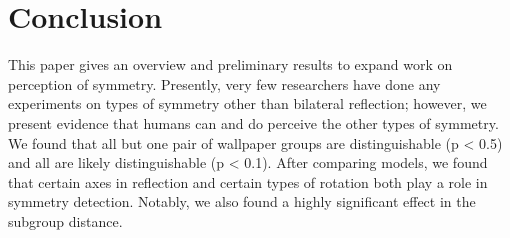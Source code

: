 \section{Conclusion}
This paper gives an overview and preliminary results to expand work on perception of symmetry. Presently, very few researchers have done any experiments on types of symmetry other than bilateral reflection; however, we present evidence that humans can and do perceive the other types of symmetry. We found that all but one pair of wallpaper groups are distinguishable (p < 0.5) and all are likely distinguishable (p < 0.1). After comparing models, we found that certain axes in reflection and certain types of rotation both play a role in symmetry detection. Notably, we also found a highly significant effect in the subgroup distance.
